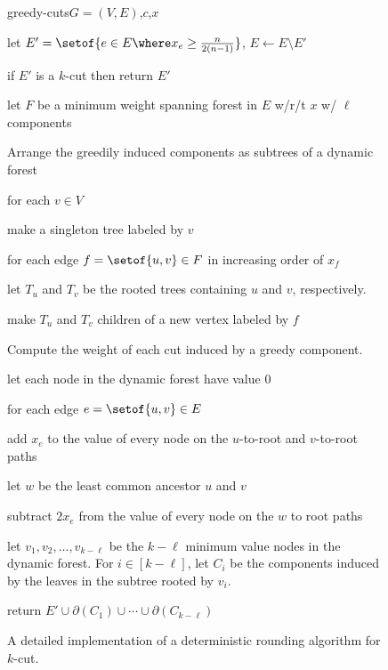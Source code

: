 \documentclass[11pt]{article}
\numberwithin{equation}{section}
\theoremstyle{definition}
\theoremstyle{plain}
\newcommand{\cost}{c} %
\begin{document}
\begin{figure}[t!]
  \begin{algorithm}{greedy-cuts}{$G=(V,E)$,$\cost$,$x$}
  \item let $E' = \setof{e \in E \where x_e \geq \frac{n}{2 (n-1)}}$,
    $E \gets E \setminus E'$
  \item if $E'$ is a $k$-cut then return $E'$
  \item let $F$ be a minimum weight spanning forest in $E$ w/r/t $x$
    w/ $\ell$ components
    \begin{itemcomment}
      Arrange the greedily induced components as subtrees of a
      dynamic forest
    \end{itemcomment}
  \item for each $v \in V$
    \begin{steps}
    \item make a singleton tree labeled by $v$
    \end{steps}
  \item for each edge $f = \setof{u,v} \in F$ in increasing order of
    $x_f$
    \begin{steps}
    \item let $T_u$ and $T_v$ be the rooted trees containing $u$ and
      $v$, respectively.
    \item make $T_u$ and $T_v$ children of a new vertex labeled by
      $f$
    \end{steps}
    \begin{itemcomment}
      Compute the weight of each cut induced by a greedy component.
    \end{itemcomment}
  \item let each node in the dynamic forest have value $0$
  \item for each edge $e = \setof{u,v} \in E$
    \begin{steps}
    \item add $x_e$ to the value of every node on the $u$-to-root
      and $v$-to-root paths
    \item let $w$ be the least common ancestor $u$ and $v$
    \item subtract $2 x_e$ from the value of every node on the $w$
      to root paths
    \end{steps}
  \item let $v_1,v_2,\dots,v_{k - \ell}$ be the $k - \ell$ minimum
    value nodes in the dynamic forest. For $i \in [k-\ell]$, let
    $C_i$ be the components induced by the leaves in the subtree
    rooted by $v_i$.
  \item return
    $E' \cup \partial(C_1) \cup \cdots \cup \partial(C_{k-\ell})$
  \end{algorithm}
  \begin{implicitframed}
    \caption{A detailed implementation of a deterministic rounding
      algorithm for $k$-cut. }
  \end{implicitframed}
\end{figure}
\end{document}
